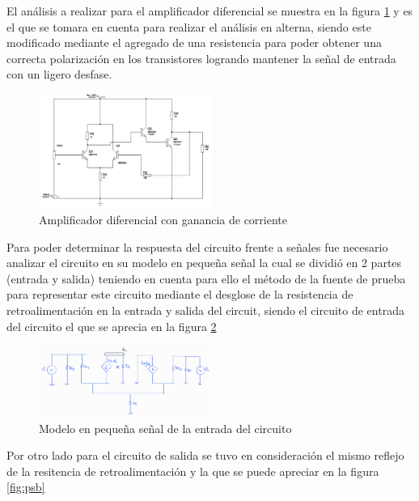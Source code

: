 \documentclass[conference]{IEEEtran}
\begin{document}
    El análisis a realizar para el amplificador diferencial se muestra en la figura \ref{fig:circuito-inicial} y es el que se tomara en cuenta para realizar el análisis en alterna, siendo este modificado mediante el agregado de una resistencia para poder obtener una correcta polarización en los transistores logrando mantener la señal de entrada con un ligero desfase.
    
    \begin{figure}[h]
        \centering
        \includegraphics[width=0.5\textwidth]{media/circuito-dc.png}
        \caption{Amplificador diferencial con ganancia de corriente}
        \label{fig:circuito-inicial}
    \end{figure}
    
    Para poder determinar la respuesta del circuito frente a señales fue necesario analizar el circuito en su modelo en pequeña señal la cual se dividió en 2 partes (entrada y salida) teniendo en cuenta para ello el método de la fuente de prueba para representar este circuito mediante el desglose de la resistencia de retroalimentación en la entrada y salida del circuit, siendo el circuito de entrada del circuito el que se aprecia en la figura \ref{fig:psa}

    \begin{figure}[h]
        \centering
        \includegraphics[width=0.5\textwidth]{media/modelo-pequena-senial-a}
        \caption{Modelo en pequeña señal de la entrada del circuito}
        \label{fig:psa}
    \end{figure}

    Por otro lado para el circuito de salida se tuvo en consideración el mismo reflejo de la resitencia de retroalimentación y la que se puede apreciar en la figura \ref{fig:psb}
\end{document}
